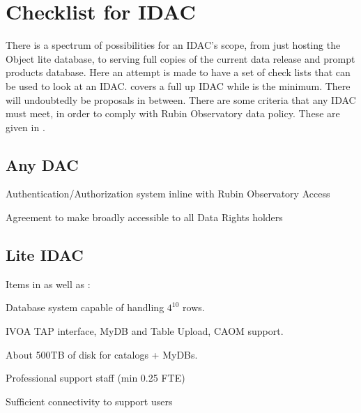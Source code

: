 
\section{Checklist for IDAC}\label{sec:checklist}

There is a spectrum of possibilities for an IDAC's scope, from just hosting the Object lite database, to serving full copies of the current data release and prompt products database.
Here an attempt is made to have a set of check lists  that can be used to look at an IDAC.
 covers a full up IDAC while   is the minimum.
There will undoubtedly be proposals in between. There are some criteria that any IDAC must meet, in order to comply with Rubin Observatory data policy. These are given in .

\subsection{Any DAC} \label{sec:anyDAC}
\begin{todolist}
\item Authentication/Authorization system  inline with Rubin Observatory Access
\item Agreement to make broadly accessible to all Data Rights holders
\end{todolist}

\subsection{Lite IDAC} \label{sec:liteDAC}
Items in  as well as :
\begin{todolist}
\item Database system capable of handling $4^{10}$ rows.
\item IVOA TAP interface, MyDB and Table Upload, CAOM support.
\item About 500TB of disk for catalogs + MyDBs.
\item Professional support staff (min 0.25 FTE)
\item Sufficient connectivity to support users
\end{todolist}

